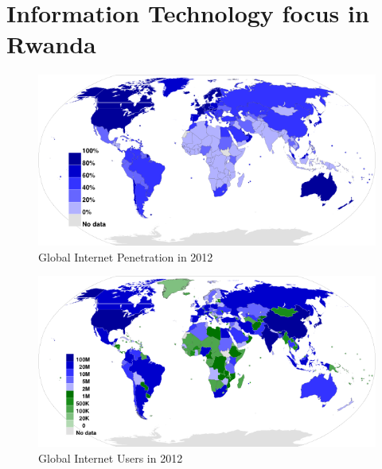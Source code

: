 \section{Information Technology focus in Rwanda}

\begin{figure}
\centering
\includegraphics[width=12cm]{empirical/images/internet_penetration_2012}
\caption{Global Internet Penetration in 2012 \cite{3}}
\label{fig:global_internet_penetration_2012}
\end{figure}

\begin{figure}
\centering
\includegraphics[width=12cm]{empirical/images/internet_users_2012}
\caption{Global Internet Users in 2012 \cite{3}}
\label{fig:global_internet_users_2012}
\end{figure}

